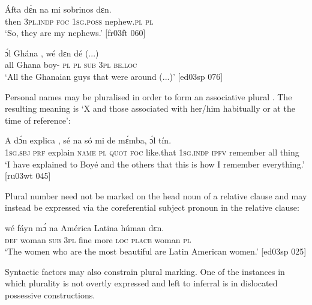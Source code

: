 \ea%
    \label{ex:key:216}
    \gll \'{A}fta    dɛ́n    na  mi    sobrinos    dɛn.\\
then  \textsc{3pl.indp}  \textsc{foc}  \textsc{1sg.poss}  nephew.\textsc{pl}  \textsc{pl}\\

\glt ‘So, they are my nephews.’ [fr03ft 060]
\z


\ea%
    \label{ex:key:217}
    \gll ɔ́l  Ghána    ,    wé  dɛn  dé  (...)\\
all  Ghana  boy-  \textsc{pl}  \textsc{pl}    \textsc{sub}  \textsc{3pl}  \textsc{be.loc}\\

\glt ‘All the Ghanaian guys that were around (...)’ [ed03sp 076]
\z

Personal names may be pluralised in order to form an associative plural . The resulting meaning is ‘X and those associated with her/him habitually or at the time of reference’:


\ea%
    \label{ex:key:218}
    \gll \MakeUppercase{A}   dɔ́n    explica    ,    sé    na  só
mi    de  mɛ́mba,    ɔ́l  tín.\\
\textsc{1sg.sbj}  \textsc{prf}    explain  \textsc{name}  \textsc{pl}    \textsc{quot}  \textsc{foc}  like.that  
\textsc{1sg.indp}  \textsc{ipfv}  remember  all  thing\\

\glt ‘I have explained to Boyé and the others that this is how I remember everything.’ [ru03wt 045]
\z

Plural number need not be marked on the head noun of a relative clause and may instead be expressed via the coreferential subject pronoun in the relative clause:


\ea%
    \label{ex:key:219}
    \gll {}    wé    fáyn    mɔ́    na  {América Latina}
húman  dɛn.\\
\textsc{def}  woman  \textsc{sub}  \textsc{3pl}  fine    more  \textsc{loc}  \textsc{place}
woman  \textsc{pl}\\

\glt ‘The women who are the most beautiful are Latin American women.’ [ed03sp 025]
\z

Syntactic factors may also constrain plural marking. One of the instances in which plurality is not overtly expressed and left to inferral is in dislocated possessive constructions.


